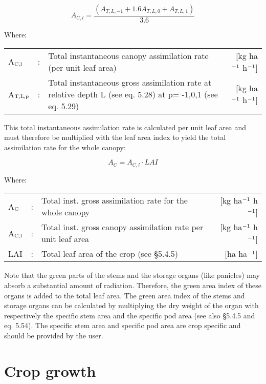 \begin{equation}
A_{C,l} = {\frac{(A_{T,L,-1} + 1.6 A_{T,L,0} + A_{T,L,1})}{3.6}}
\end{equation}

Where:\\[5pt]
\begin{tabularx}{\textwidth}{llXr}
A$_{{\rm C,l}}$ &:& Total instantaneous canopy assimilation 
   rate (per unit leaf area)    &    [kg ha$^{{\rm -1}}$ h$^{{\rm -1}}$]\\
A$_{{\rm T,L,p}}$ &:& Total instantaneous gross assimilation rate at relative 
   depth L (see eq. 5.28) at p= -1,0,1 (see eq. 5.29)    &    
   [kg ha$^{{\rm -1}}$ h$^{{\rm -1}}$]\\
\end{tabularx}

This total instantaneous assimilation rate is calculated per unit leaf area and must
therefore be multiplied with the leaf area index to yield the total assimilation rate for the
whole canopy:

\begin{equation}
A_{C} = A_{C,l} \cdot LAI
\end{equation}

Where:\\[5pt]
\begin{tabularx}{\textwidth}{llXr}
A$_{{\rm C}}$ &:& Total inst. gross assimilation rate for
   the whole canopy  &  [kg ha$^{{\rm -1}}$ h$^{{\rm -1}}$]\\
A$_{{\rm C,l}}$ &:& Total inst. gross canopy assimilation rate 
   per unit leaf area &  [kg ha$^{{\rm -1}}$ h$^{{\rm -1}}$]\\
LAI &:& Total leaf area of the crop (see \S 5.4.5)  & [ha ha$^{{\rm -1}}$]\\
\end{tabularx}

Note that the green parts of the stems and the storage organs (like panicles) may absorb a
substantial amount of radiation. Therefore, the green area index of these organs is added
to the total leaf area. The green area index of the stems and storage organs can be
calculated by multiplying the dry weight of the organ with respectively the specific stem
area and the specific pod area (see also \S 5.4.5 and eq. 5.54). The specific stem area and
specific pod area are crop specific and should be provided by the user.


\section{Crop growth}

